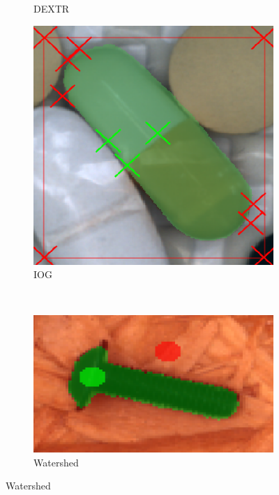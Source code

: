 \begin{figure}
\begin{subfigure}[t]{0.3\textwidth}
		\caption{
			DEXTR
		}
	\end{subfigure}
	\hfill
	\begin{subfigure}[t]{0.3\textwidth}
		\centering
		\includegraphics[width=\textwidth]{figures/appendix/method_predictions/pill56_iog.png}
		\caption{
			IOG
		}
	\end{subfigure}
	\\	
	\begin{subfigure}[t]{0.3\textwidth}
		\centering
		\includegraphics[width=\textwidth]{figures/appendix/method_predictions/screw57_watershed.png}
		\caption{
			Watershed
		}
	\end{subfigure}

\end{figure}
